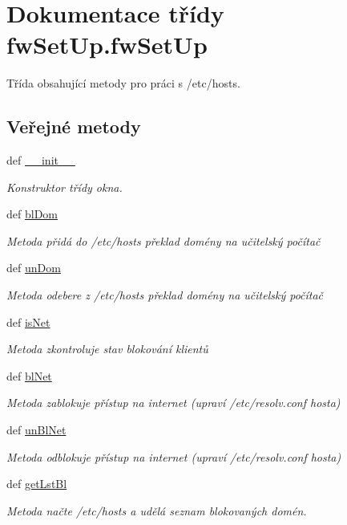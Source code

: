 \hypertarget{classfwSetUp_1_1fwSetUp}{\section{Dokumentace třídy fw\-Set\-Up.\-fw\-Set\-Up}
\label{dd/dd2/classfwSetUp_1_1fwSetUp}
}


Třída obsahující metody pro práci s /etc/hosts.  


\subsection*{Veřejné metody}
\begin{DoxyCompactItemize}
\item 
def \hyperlink{classfwSetUp_1_1fwSetUp_ad05f56aa9dd4503852ec2bcfb2a3afe2}{\-\_\-\-\_\-init\-\_\-\-\_\-}
\begin{DoxyCompactList}\small\item\em Konstruktor třídy okna. \end{DoxyCompactList}\item 
def \hyperlink{classfwSetUp_1_1fwSetUp_aea3760656409015f15b9b3450edd70e1}{bl\-Dom}
\begin{DoxyCompactList}\small\item\em Metoda přidá do /etc/hosts překlad domény na učitelský počítač \end{DoxyCompactList}\item 
def \hyperlink{classfwSetUp_1_1fwSetUp_a3a03c76b94db3bc750260ab64d76d755}{un\-Dom}
\begin{DoxyCompactList}\small\item\em Metoda odebere z /etc/hosts překlad domény na učitelský počítač \end{DoxyCompactList}\item 
def \hyperlink{classfwSetUp_1_1fwSetUp_a75a8c09d8493ac43747cb4c518bef7dd}{is\-Net}
\begin{DoxyCompactList}\small\item\em Metoda zkontroluje stav blokování klientů \end{DoxyCompactList}\item 
def \hyperlink{classfwSetUp_1_1fwSetUp_a4d21f86d17c54919fbdc2e3f069fa471}{bl\-Net}
\begin{DoxyCompactList}\small\item\em Metoda zablokuje přístup na internet (upraví /etc/resolv.conf hosta) \end{DoxyCompactList}\item 
def \hyperlink{classfwSetUp_1_1fwSetUp_a4f770f10b81c0030b1753dfb60452045}{un\-Bl\-Net}
\begin{DoxyCompactList}\small\item\em Metoda odblokuje přístup na internet (upraví /etc/resolv.conf hosta) \end{DoxyCompactList}\item 
def \hyperlink{classfwSetUp_1_1fwSetUp_a9d56382f2c43c78f6dcf2057580a5ed2}{get\-Lst\-Bl}
\begin{DoxyCompactList}\small\item\em Metoda načte /etc/hosts a udělá seznam blokovaných domén. \end{DoxyCompactList}\end{DoxyCompactItemize}
